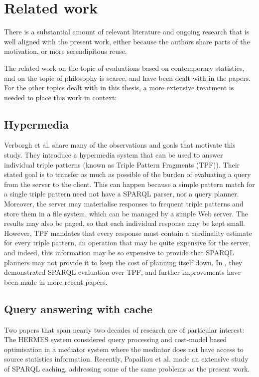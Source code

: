\section{Related work}\label{sec:related}

There is a substantial amount of relevant literature and ongoing
research that is well aligned with the present work, either because
the authors share parts of the motivation, or more serendipitous
reuse.

The related work on the topic of evaluations based on contemporary
statistics, and on the topic of philosophy is scarce, and have been
dealt with in the papers. For the other topics dealt with in this
thesis, a more extensive treatment is needed to place this work in
context:

\subsection{Hypermedia}

Verborgh et al. \cite{ldf1} share many of the observations and goals
that motivate this study. They introduce a hypermedia system that can
be used to answer individual triple patterns (known as Triple Pattern
Fragments (TPF)). Their stated goal is to transfer as much as possible
of the burden of evaluating a query from the server to the
client. This can happen because a simple pattern match for a single
triple pattern need not have a SPARQL parser, nor a query
planner. Moreover, the server may materialise responses to frequent
triple patterns and store them in a file system, which can be managed
by a simple Web server. The results may also be paged, so that each
individual response may be kept small. However, TPF mandates that
every response must contain a cardinality estimate for every triple
pattern, an operation that may be quite expensive for the server, and
indeed, this information may be so expensive to provide that SPARQL
planners may not provide it to keep the cost of planning itself
down. In \cite{verborgh2014querying}, they demonstrated SPARQL evaluation over TPF,
and further improvements have been made in more recent papers.

\subsection{Query answering with cache}

Two papers that span nearly two decades of research are of particular
interest: The HERMES system \cite{adali1996query} considered query
processing and cost-model based optimisation in a mediator system
where the mediator does not have access to source statistics
information. Recently, Papailiou et al. \cite{papailiou2015graph}
made an extensive study of SPARQL caching, addressing some of the same
problems as the present work.

